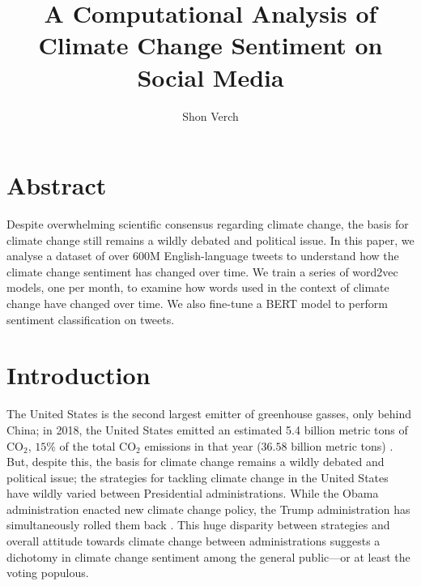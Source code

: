 \documentclass{paper}
\title{\bf{A Computational Analysis of \\ Climate Change Sentiment on Social Media}}
\author{Shon Verch}
\date{}
\begin{document}
\maketitle

\section*{Abstract}
Despite overwhelming scientific consensus regarding climate change, the basis for climate change still remains a wildly debated and political issue. In this paper, we analyse a dataset of over 600M English-language tweets to understand how the climate change sentiment has changed over time. We train a series of word2vec models, one per month, to examine how words used in the context of climate change have changed over time. We also fine-tune a BERT model to perform sentiment classification on tweets.


\section{Introduction}
The United States is the second largest emitter of greenhouse gasses, only behind China; in 2018, the United States emitted an estimated 5.4 billion metric tons of $\text{CO}_2$, $15\%$ of the total $\text{CO}_2$ emissions in that year ($36.58$ billion metric tons) \cite{our_world_in_data:co2_emissions, epa:inventory_us_greenhouse_gas_emissions_and_sinks, usgs:faqs_co2}. But, despite this, the basis for climate change remains a wildly debated and political issue; the strategies for tackling climate change in the United States have wildly varied between Presidential administrations. While the Obama administration enacted new climate change policy, the Trump administration has simultaneously rolled them back \cite{washington_post:trump_climate_change}. This huge disparity between strategies and overall attitude towards climate change between administrations suggests a dichotomy in climate change sentiment among the general public---or at least the voting populous.
\end{document}
